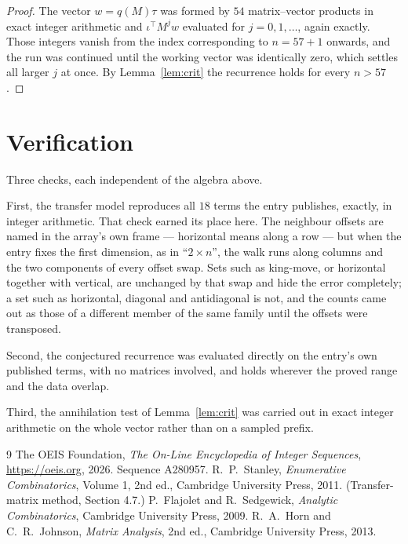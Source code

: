 \documentclass[11pt,a4paper]{article}
\theoremstyle{plain}
\theoremstyle{definition}
\begin{document}
\begin{proof}
The vector $w=q(M)\tau$ was formed by $54$ matrix--vector products in exact integer
arithmetic and $\iota^{\!\top}M^{j}w$ evaluated for $j=0,1,\dots$, again exactly. Those
integers vanish from the index corresponding to $n=57+1$ onwards, and the run was
continued until the working vector was identically zero, which settles all larger $j$ at once.
By Lemma~\ref{lem:crit} the recurrence holds for every $n>57$.
\end{proof}

\section{Verification}

Three checks, each independent of the algebra above.

First, the transfer model reproduces all $18$ terms the entry publishes, exactly, in
integer arithmetic. That check earned its place here. The neighbour offsets are named in the
array's own frame --- horizontal means along a row --- but when the entry fixes the first
dimension, as in ``$2\times n$'', the walk runs along columns and the two components of every
offset swap. Sets such as king-move, or horizontal together with vertical, are unchanged by
that swap and hide the error completely; a set such as horizontal, diagonal and antidiagonal
is not, and the counts came out as those of a different member of the same family until the
offsets were transposed.

Second, the conjectured recurrence was evaluated directly on the entry's own published terms,
with no matrices involved, and holds wherever the proved range and the data overlap.

Third, the annihilation test of Lemma~\ref{lem:crit} was carried out in exact integer
arithmetic on the whole vector rather than on a sampled prefix.

\begin{thebibliography}{9}
 The OEIS Foundation, \emph{The On-Line Encyclopedia of Integer
Sequences}, \url{https://oeis.org}, 2026. Sequence A280957.
 R.~P.~Stanley, \emph{Enumerative Combinatorics}, Volume 1, 2nd ed.,
Cambridge University Press, 2011. (Transfer-matrix method, Section 4.7.)
 P.~Flajolet and R.~Sedgewick, \emph{Analytic Combinatorics}, Cambridge
University Press, 2009.
 R.~A.~Horn and C.~R.~Johnson, \emph{Matrix Analysis}, 2nd ed., Cambridge
University Press, 2013.
\end{thebibliography}
\end{document}
